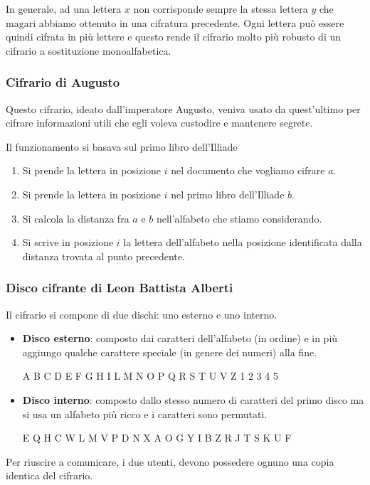 In generale, ad una lettera $x$ non corrisponde sempre la stessa lettera $y$ che magari abbiamo ottenuto in una cifratura
precedente. Ogni lettera pu\`o essere quindi cifrata in pi\`u lettere e questo rende il cifrario molto pi\`u robusto di un
cifrario a sostituzione monoalfabetica.

\subsubsection{Cifrario di Augusto}
Questo cifrario, ideato dall'imperatore Augusto, veniva usato da quest'ultimo per cifrare informazioni utili che egli voleva
custodire e mantenere segrete.

Il funzionamento si basava sul primo libro dell'Illiade
\begin{enumerate}
	\item Si prende la lettera in posizione $i$ nel documento che vogliamo cifrare $a$.
	\item Si prende la lettera in posizione $i$ nel primo libro dell'Illiade $b$.
	\item Si calcola la distanza fra $a$ e $b$ nell'alfabeto che stiamo considerando.
	\item Si scrive in posizione $i$ la lettera dell'alfabeto nella posizione identificata dalla distanza trovata al punto
	      precedente.
\end{enumerate}

\subsubsection{Disco cifrante di Leon Battista Alberti}
Il cifrario si compone di due dischi: uno esterno e uno interno.
\begin{itemize}
	\item \textbf{Disco esterno}: composto dai caratteri dell'alfabeto (in ordine) e in pi\`u aggiungo qualche carattere
	      speciale (in genere dei numeri) alla fine.
	      \begin{center}
		      A B C D E F G H I L M N O P Q R S T U V Z 1 2 3 4 5
	      \end{center}
	\item \textbf{Disco interno}: composto dallo stesso numero di caratteri del primo disco ma si usa un alfabeto
	      pi\`u ricco e i caratteri sono permutati.
	      \begin{center}
		      E Q H C W L M V P D N X A O G Y I B Z R J T S K U F
	      \end{center}
\end{itemize}
Per riuscire a comunicare, i due utenti, devono possedere ognuno una copia identica del cifrario.

